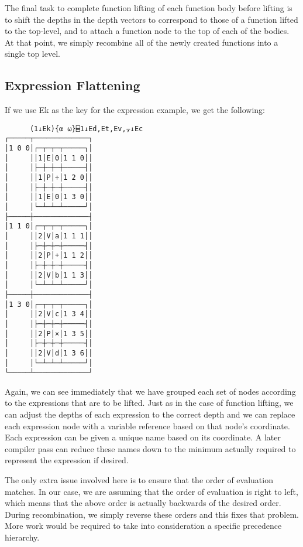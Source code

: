 \documentclass[pldi]{sigplanconf-pldi15}
\begin{document}
The final task to complete function lifting of each function body before lifting is to shift the depths in 
the depth vectors to correspond to those of a function lifted to the top-level, and to attach a function 
node to the top of each of the bodies. At that point, we simply recombine all of the newly created functions 
into a single top level. 
\subsection{Expression Flattening}

If we use Ek as the key for the expression example, we get the following:

\begin{verbatim}
      (1↓Ek){⍺ ⍵}⌸1↓Ed,Et,Ev,⍪↓Ec
┌─────┬─────────────┐
│1 0 0│┌─┬─┬─┬─────┐│
│     ││1│E│0│1 1 0││
│     │├─┼─┼─┼─────┤│
│     ││1│P│÷│1 2 0││
│     │├─┼─┼─┼─────┤│
│     ││1│E│0│1 3 0││
│     │└─┴─┴─┴─────┘│
├─────┼─────────────┤
│1 1 0│┌─┬─┬─┬─────┐│
│     ││2│V│a│1 1 1││
│     │├─┼─┼─┼─────┤│
│     ││2│P│+│1 1 2││
│     │├─┼─┼─┼─────┤│
│     ││2│V│b│1 1 3││
│     │└─┴─┴─┴─────┘│
├─────┼─────────────┤
│1 3 0│┌─┬─┬─┬─────┐│
│     ││2│V│c│1 3 4││
│     │├─┼─┼─┼─────┤│
│     ││2│P│×│1 3 5││
│     │├─┼─┼─┼─────┤│
│     ││2│V│d│1 3 6││
│     │└─┴─┴─┴─────┘│
└─────┴─────────────┘
\end{verbatim}

Again, we can see immediately that we have grouped each set of nodes according to the expressions 
that are to be lifted. Just as in the case of function lifting, we can adjust the depths of each 
expression to the correct depth and we can replace each expression node with a variable reference
 based on that node’s coordinate. Each expression can be given a unique name based on its 
 coordinate. A later compiler pass can reduce these names down to the minimum actually required to 
 represent the expression if desired. 

The only extra issue involved here is to ensure that the order of evaluation matches. In our case, we 
are assuming that the order of evaluation is right to left, which means that the above order is actually 
backwards of the desired order. During recombination, we simply reverse these orders and this fixes 
that problem. More work would be required to take into consideration a specific precedence hierarchy. 
\end{document}
